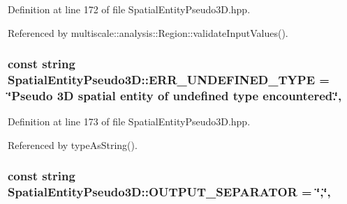 Definition at line 172 of file Spatial\-Entity\-Pseudo3\-D.\-hpp.



Referenced by multiscale\-::analysis\-::\-Region\-::validate\-Input\-Values().

\hypertarget{classmultiscale_1_1analysis_1_1SpatialEntityPseudo3D_ad16aacdb05ba1922124c6b6c76077d32}{
\subsubsection[{E\-R\-R\-\_\-\-U\-N\-D\-E\-F\-I\-N\-E\-D\-\_\-\-T\-Y\-P\-E}]{\setlength{\rightskip}{0pt plus 5cm}const string Spatial\-Entity\-Pseudo3\-D\-::\-E\-R\-R\-\_\-\-U\-N\-D\-E\-F\-I\-N\-E\-D\-\_\-\-T\-Y\-P\-E = \char`\"{}Pseudo 3\-D spatial entity of undefined type encountered.\char`\"{}\hspace{0.3cm}{\ttfamily [static]}, {\ttfamily [protected]}}}\label{classmultiscale_1_1analysis_1_1SpatialEntityPseudo3D_ad16aacdb05ba1922124c6b6c76077d32}


Definition at line 173 of file Spatial\-Entity\-Pseudo3\-D.\-hpp.



Referenced by type\-As\-String().

\hypertarget{classmultiscale_1_1analysis_1_1SpatialEntityPseudo3D_a4ee08be9b4119b90f0a996704d179635}{
\subsubsection[{O\-U\-T\-P\-U\-T\-\_\-\-S\-E\-P\-A\-R\-A\-T\-O\-R}]{\setlength{\rightskip}{0pt plus 5cm}const string Spatial\-Entity\-Pseudo3\-D\-::\-O\-U\-T\-P\-U\-T\-\_\-\-S\-E\-P\-A\-R\-A\-T\-O\-R = \char`\"{},\char`\"{}\hspace{0.3cm}{\ttfamily [static]}, {\ttfamily [protected]}}}\label{classmultiscale_1_1analysis_1_1SpatialEntityPseudo3D_a4ee08be9b4119b90f0a996704d179635}


